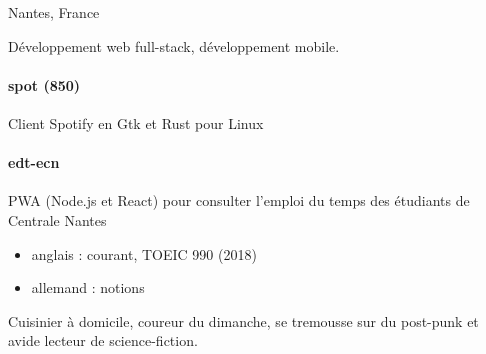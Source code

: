 \documentclass{cv}
\begin{document}
\begin{minipage}[t]{0.28\textwidth}%


	 Nantes, France
	\newline{} %
	\newline{} \href{mailto:%
	}{\link{%
	}}%
	\newline{} \href{https://github.com/xou816}{} 


	Développement web full-stack, développement mobile.

	\begin{center}
	  
	  
	  
	  
	\end{center}

	\raggedright
	\paragraph{spot {\footnotesize(\faStar{}850)}} Client Spotify en Gtk et Rust pour Linux
	\paragraph{edt-ecn} PWA (Node.js et React) pour consulter l'emploi du temps des étudiants de Centrale Nantes


	\begin{itemize}
	\item anglais : courant, TOEIC 990 (2018)
	\item allemand : notions
	\end{itemize}
		

	Cuisinier à domicile, coureur du dimanche, se tremousse sur du post-punk et avide lecteur de science-fiction.

\end{minipage}
\end{document}
